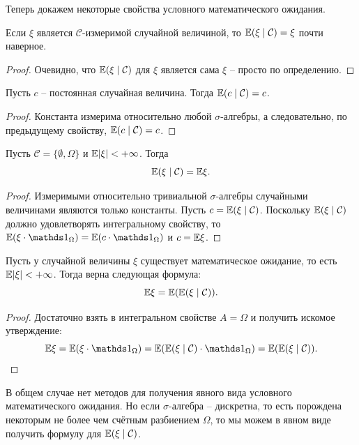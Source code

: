 Теперь докажем некоторые свойства условного математического ожидания.
\begin{property}
    Если $\xi$ является $\mathcal{C}$-измеримой случайной величиной, то $\mathbb{E}(\xi \mid \mathcal{C}) = \xi$ почти наверное.
\end{property}
\begin{proof}
    Очевидно, что $\mathbb{E}(\xi \mid \mathcal{C})$ для $\xi$ является сама $\xi$ -- просто по определению.
\end{proof}
\begin{property}
    Пусть $c$ -- постоянная случайная величина. Тогда $\mathbb{E}(c \mid \mathcal{C}) = c$.
\end{property}
\begin{proof}
    Константа измерима относительно любой $\sigma$-алгебры, а следовательно, по предыдущему свойству, $\mathbb{E}(c \mid \mathcal{C}) = c$.
\end{proof}
\begin{property}
    Пусть $\mathcal{C} = \{\emptyset, \Omega\}$ и $\mathbb{E} |\xi| < +\infty$. Тогда
    \[
    \mathbb{E}(\xi \mid \mathcal{C}) = \mathbb{E} \xi.
    \]
\end{property}
\begin{proof}
    Измеримыми относительно тривиальной $\sigma$-алгебры случайными величинами являются только константы. Пусть $c = \mathbb{E}(\xi \mid \mathcal{C})$. Поскольку $\mathbb{E} (\xi \mid \mathcal{C})$ должно удовлетворять интегральному свойству, то $\Ex (\xi \cdot \Ind_\Omega) = \Ex (c \cdot \Ind_{\Omega})$ и $c = \mathbb{E}\xi$.
\end{proof}
\begin{property}
    Пусть у случайной величины $\xi$ существует математическое ожидание, то есть $\mathbb{E} |\xi| < +\infty$. Тогда верна следующая формула:
    \[\mathbb{E} \xi = \mathbb{E}(\mathbb{E}(\xi \mid \mathcal{C})).\]
\end{property}
\begin{proof}
    Достаточно взять в интегральном свойстве $A = \Omega$ и получить искомое утверждение:
    \[
        \Ex \xi = \Ex (\xi \cdot \Ind_{\Omega}) = \Ex(\Ex(\xi \mid \mathcal{C}) \cdot \Ind_{\Omega}) = \Ex(\Ex(\xi \mid \mathcal{C})).
    \]
\end{proof}

В общем случае нет методов для получения явного вида условного математического ожидания. 
Но если $\sigma$-алгебра -- дискретна, то есть порождена некоторым не более чем счётным разбиением $\Omega$, то мы можем в явном виде получить формулу для $\mathbb{E} (\xi \mid \mathcal{C})$.

